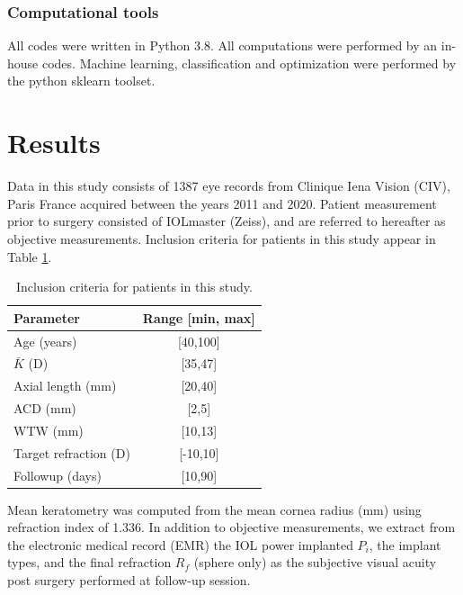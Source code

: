 \documentclass[article,twocolumn,preprint,10pt]{paper}%
\renewcommand{\(}{\left(}
\renewcommand{\)}{\right)}
\renewcommand{\[}{\left[}
\renewcommand{\]}{\right]}
\newcommand{\1}{\mbox{\boldmath$1$}}
\begin{document}
\subsubsection{Computational tools}
All codes were written in Python 3.8. All computations were performed by an in-house codes. Machine learning, classification and optimization were performed by the python sklearn toolset.


\section{Results}
Data in this study consists of 1387 eye records from Clinique Iena Vision (CIV), Paris France acquired between the years 2011 and 2020. Patient measurement prior to surgery consisted of IOLmaster (Zeiss), and are referred to hereafter as objective measurements. 
Inclusion criteria for patients in this study appear in Table \ref{Table: inclusionCriteria}. 
\begin{table}
	\begin{tabular}{l|c|}
		Parameter & Range [min, max] \\
		\hline  
		Age (years)  & [40,100]\\
		$\bar{K}$ (D)& [35,47]\\
		Axial length (mm)  & [20,40]\\
		ACD (mm) & [2,5]\\
		WTW (mm) & [10,13]\\
		Target refraction (D) & [-10,10]\\
		Followup (days) & [10,90]
	\end{tabular}
	\label{Table: inclusionCriteria}
	\caption{Inclusion criteria for patients in this study.}
\end{table}
Mean keratometry was computed from the mean cornea radius (mm) using refraction index of 1.336. In addition to objective measurements, we extract from the electronic medical record (EMR) the IOL power implanted $P_i$, the implant types, and the final refraction $R_f$ (sphere only) as the subjective visual acuity post surgery performed at follow-up session.
\end{document}
